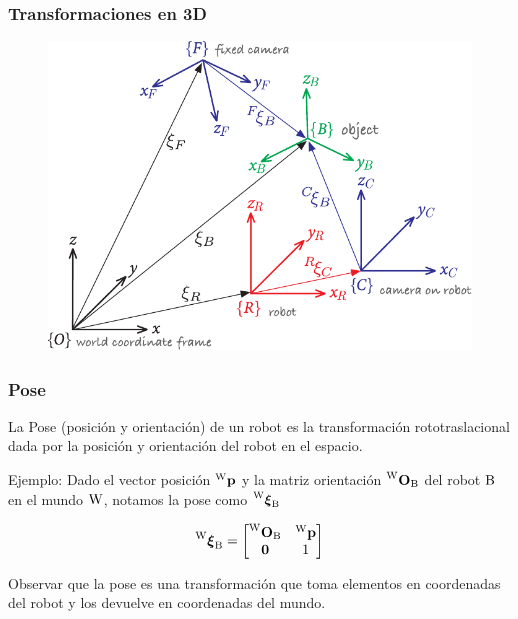 \begin{frame}
    \frametitle{Transformaciones en 3D}
    
    \begin{figure}[!h]
        \includegraphics[width=0.6\columnwidth]{./images/multiple_coordinate_frames_3d.pdf}
    \end{figure}
    
\end{frame}

\begin{frame}
    \frametitle{Pose}
    
    La Pose (posición y orientación) de un robot es la transformación rototraslacional dada por la posición y orientación del robot en el espacio.
    
    Ejemplo: Dado el vector posición $\prescript{\mathrm{\mathrm{W}}}{}{\boldsymbol{\mathbf{p}}}$ y la matriz orientación $\prescript{\mathrm{\mathrm{W}}}{}{{\boldsymbol{\mathbf{O}}}_\mathrm{\mathrm{B}}}$ del robot $\mathrm{B}$ en el mundo $\mathrm{W}$, notamos la pose como $\prescript{\mathrm{\mathrm{W}}}{}{{\boldsymbol{\mathbf{\xi}}}_\mathrm{\mathrm{B}}}$
    
    \begin{equation*}
        \prescript{\mathrm{\mathrm{W}}}{}{{\boldsymbol{\mathbf{\xi}}}_\mathrm{\mathrm{B}}}=
        \begin{bmatrix}
            \prescript{\mathrm{\mathrm{W}}}{}{{\boldsymbol{\mathbf{O}}}_\mathrm{\mathrm{B}}} & \prescript{\mathrm{\mathrm{W}}}{}{\boldsymbol{\mathbf{p}}}\\
            \boldsymbol{\mathbf{0}} & 1
        \end{bmatrix}
    \end{equation*}
    
    Observar que la pose es una transformación que toma elementos en coordenadas del robot y los devuelve en coordenadas del mundo.
\end{frame}

